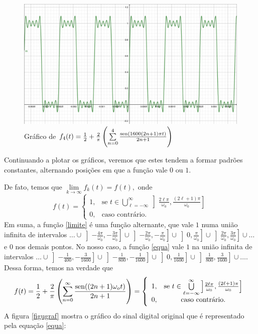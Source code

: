 \documentclass[11pt,twoside,a4paper]{book}
\begin{document}
\begin{figure}
    \centering
    \includegraphics[width=.95\textwidth]{figuras/grafiof4malha.png}
    \caption{Gráfico de $f_4(t) =\frac{1}{2} + \frac{2}{\pi} \left( \sum\limits_{n = 0}^{4} \frac{{\rm sen}(1600(2n+1) \pi t)}{2n+1} \right)  $}
    \label{fig:4}
\end{figure}
\newpage
Continuando a plotar os gráficos, veremos que estes tendem a formar padrões constantes, alternando posições em que a função vale $0$ ou $1$. 

De fato, temos que $\lim\limits_{k \to \infty} f_k(t) = f(t), $ onde 
\begin{equation}\label{limite}
f(t) = \left\{\begin{array}{lc}
1, & \mbox{se } t \in \bigcup\limits_{\ell =-\infty}^\infty \left] \frac{2 \ell \pi}{\omega_0}, \frac{(2 \ell + 1) \pi}{\omega_0} \right] \\
0, & \mbox{caso contrário.} 
\end{array} \right.
\end{equation}
Em suma, a função \ref{limite} é uma função alternante, que vale $1$ numa união infinita de intervalos $\ldots \cup \left]  -\frac{4 \pi}{\omega_0}, -\frac{3 \pi}{\omega_0} \right] \cup \left]  -\frac{2 \pi}{\omega_0}, -\frac{ \pi}{\omega_0} \right] \cup \left]  0, \frac{\pi}{\omega_0} \right] \cup \left]  \frac{2 \pi}{\omega_0}, \frac{3 \pi}{\omega_0} \right] \cup \ldots$ e $0$ nos demais pontos. No nosso caso, a função \ref{equa} vale $1$ na união infinita de intervalos $\ldots \cup \left]  -\frac{1}{400}, -\frac{3}{1600} \right] \cup \left]  -\frac{1}{800}, -\frac{1}{1600} \right] \cup \left]  0, \frac{1}{1600} \right] \cup \left]  \frac{1}{800}, \frac{3}{1600} \right] \cup \ldots$. Dessa forma, temos na verdade que
\[
f(t) = \frac{1}{2} + \frac{2}{\pi} \left( \sum\limits_{n = 0}^\infty \frac{{\rm sen}((2n+1) \omega_o t)}{2n+1} \right) = \left\{\begin{array}{lc}
1, & \mbox{se } t \in \bigcup\limits_{\ell =-\infty}^\infty \left] \frac{2 \ell \pi}{\omega_0}, \frac{(2 \ell + 1) \pi}{\omega_0} \right] \\
0, & \mbox{caso contrário.} 
\end{array} \right.
\]
A figura \ref{figugraf} mostra o gráfico do sinal digital original que é representado pela equação \ref{equa}:
\end{document}
